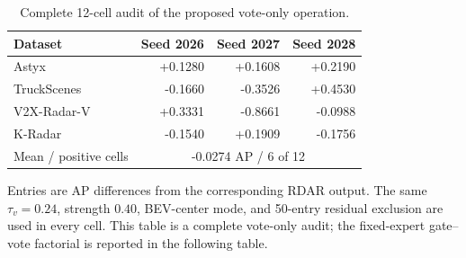 \documentclass[preprint,12pt,times]{elsarticle}
\newcommand{\reviewcaption}[1]{\caption{\textcolor{floatreviewblue}{#1}}}
\newcommand{\reviewcaption}[1]{\caption{#1}}
\begin{document}
\begin{table}[!t]
\centering
\reviewcaption{Complete 12-cell audit of the proposed vote-only operation.}
\label{tab:vote-only-12cell}
\begingroup
\color{black}
\scriptsize
\setlength{\tabcolsep}{3pt}
\renewcommand{\arraystretch}{1.10}
\begin{tabularx}{\columnwidth}{@{}Xrrr@{}}
\toprule
Dataset & Seed 2026 & Seed 2027 & Seed 2028 \\
\midrule
Astyx & +0.1280 & +0.1608 & +0.2190 \\
TruckScenes & -0.1660 & -0.3526 & +0.4530 \\
V2X-Radar-V & +0.3331 & -0.8661 & -0.0988 \\
K-Radar & -0.1540 & +0.1909 & -0.1756 \\
\midrule
Mean / positive cells & \multicolumn{3}{c}{-0.0274 AP / 6 of 12} \\
\bottomrule
\end{tabularx}
\endgroup
\vspace{2pt}
\parbox{\columnwidth}{\scriptsize
Entries are AP differences from the corresponding RDAR output. The same
$\tau_v=0.24$, strength $0.40$, BEV-center mode, and 50-entry residual
exclusion are used in every cell. This table is a complete vote-only audit;
the fixed-expert gate--vote factorial is reported in the following table.}
\end{table}
\end{document}
